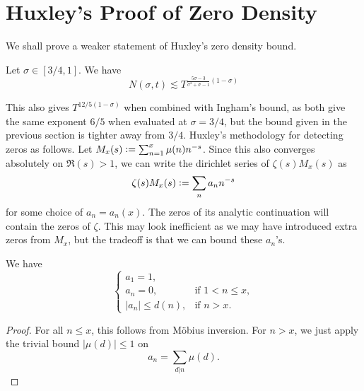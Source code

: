 \section{Huxley's Proof of Zero Density
}We shall prove a weaker statement of Huxley's zero density bound.
\begin{theorem}[Huxley]
    Let $\sigma\in[3/4,1]$. We have  \[
        N(\sigma,t)\lesssim T^{\frac{5\sigma-3}{\sigma^2+\sigma-1}(1-\sigma)}
    \]
\end{theorem}
This also gives $T^{12/5(1-\sigma)}$ when combined with Ingham's bound, as both give the same exponent $6/5$ when evaluated at $\sigma=3/4$, but the bound given in the previous section is tighter away from $3/4$.
Huxley's methodology for detecting zeros as follows. Let $M_x(s) \mathrel{\mathop:}= \sum_{n=1}^{x} \mu(n)n^{-s}$. Since this also converges absolutely on $\Re(s)>1$, we can write the dirichlet series of $\zeta(s) M_x (s)$ as \[
    \zeta(s) M_x (s) \mathrel{\mathop:}= \sum_{n}a_n n^{-s}
\]
for some choice of $a_n=a_n(x)$. The zeros of its analytic continuation will contain the zeros of $\zeta$. This may look inefficient as we may have introduced extra zeros from $M_x$, but the tradeoff is that we can bound these $a_n$'s.
\begin{proposition}
    We have  \[\begin{cases}
        a_1 = 1, & \\
        a_n = 0, & \textrm{if $1<n\leq x$},\\
        |a_n|\leq d(n), & \textrm{if $n>x$}.
    \end{cases}\]
\end{proposition}
\begin{proof}
    For all $n\leq x$, this follows from M\"obius inversion. For $n>x$, we just apply the trivial bound $|\mu(d)|\leq 1$ on \[
    a_n  = \sum_{d|n} \mu(d) .
    \]
\end{proof}

